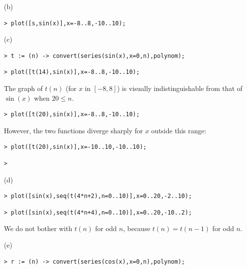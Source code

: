 \documentclass{article}
\begin{document}
\begin{Maple Normal}
(b)
\end{Maple Normal}
\begin{lstlisting}
> plot([s,sin(x)],x=-8..8,-10..10);
\end{lstlisting}
\begin{Maple Normal}
(c)
\end{Maple Normal}
\begin{lstlisting}
> t := (n) -> convert(series(sin(x),x=0,n),polynom);
\end{lstlisting}
\begin{lstlisting}
> plot([t(14),sin(x)],x=-8..8,-10..10);
\end{lstlisting}
\begin{Maple Normal}
The graph of 
$t (n)$  (for 
$x$ in 
$[-8,8]$) is visually indistinguishable from that of 
$\sin (x)$ when 
$20\le n$.
\end{Maple Normal}
\begin{lstlisting}
> plot([t(20),sin(x)],x=-8..8,-10..10);
\end{lstlisting}
\begin{Maple Normal}
However, the two functions diverge sharply for 
$x$ outside this range:
\end{Maple Normal}
\begin{lstlisting}
> plot([t(20),sin(x)],x=-10..10,-10..10);
\end{lstlisting}
\begin{lstlisting}
> 
\end{lstlisting}
\begin{Maple Normal}
(d)
\end{Maple Normal}
\begin{lstlisting}
> plot([sin(x),seq(t(4*n+2),n=0..10)],x=0..20,-2..10);
\end{lstlisting}
\begin{lstlisting}
> plot([sin(x),seq(t(4*n+4),n=0..10)],x=0..20,-10..2);
\end{lstlisting}
\begin{Maple Normal}
We do not bother with 
$t (n)$ for odd 
$n$, because 
$t (n)=t (n -1)$ for odd 
$n$.
\end{Maple Normal}
\begin{Maple Normal}

\end{Maple Normal}
\begin{Maple Normal}
(e)
\end{Maple Normal}
\begin{lstlisting}
> r := (n) -> convert(series(cos(x),x=0,n),polynom);
\end{lstlisting}
\end{document}
